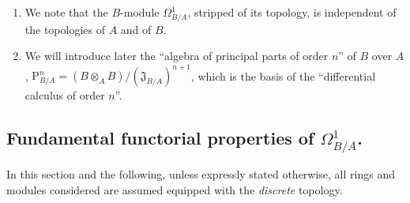 \begin{remarks}[20.4.14]
\label{0.20.4.14}
\begin{enumerate}
  \item[\rm(i)] We note that the $B$-module $\Omega^1_{B/A}$, stripped of its topology, is independent of the topologies of $A$ and of $B$.
  \item[\rm(ii)] We will introduce later the ``algebra of principal parts of order $n$'' of $B$ over $A$, $\mathrm{P}^n_{B/A}=(B\otimes_A B)/(\mathfrak{J}_{B/A})^{n+1}$, which is the basis of the ``differential calculus of order $n$''.
\end{enumerate}
\end{remarks}

\subsection{Fundamental functorial properties of \texorpdfstring{$\Omega^1_{B/A}$}{Ω¹(B/A)}.}
\label{subsection:0.20.5}

\begin{env}[20.5.1]
\label{0.20.5.1}
In this section and the following, unless expressly stated otherwise, all rings and modules considered are assumed equipped with the \emph{discrete} topology.
\end{env}

